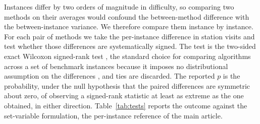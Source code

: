\documentclass[11pt]{article}
\begin{document}
Instances differ by two orders of magnitude in difficulty, so comparing two methods on their
averages would confound the between-method difference with the between-instance variance. We
therefore compare them instance by instance. For each pair of methods we take the per-instance
difference in station visits and test whether those differences are systematically signed. The
test is the two-sided exact Wilcoxon signed-rank test \citep{wilcoxon1945}, the standard choice
for comparing algorithms across a set of benchmark instances because it imposes no
distributional assumption on the differences \citep{demsar2006}, and ties are discarded. The
reported $p$ is the probability, under the null hypothesis that the paired differences are
symmetric about zero, of observing a signed-rank statistic at least as extreme as the one
obtained, in either direction. Table~\ref{tab:tests} reports the outcome against the
set-variable formulation, the per-instance reference of the main article.
\end{document}
